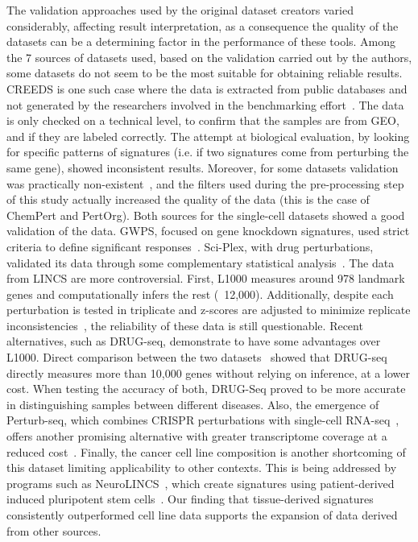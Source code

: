The validation approaches used by the original dataset creators varied considerably, affecting result interpretation, as a consequence the quality of the datasets can be a determining factor in the performance of these tools. 
Among the 7 sources of datasets used, based on the validation carried out by the authors, some datasets do not seem to be the most suitable for obtaining reliable results. 
\gls{CREEDS} is one such case where the data is extracted from public databases and not generated by the researchers involved in the benchmarking effort~\cite{RN87}. 
The data is only checked on a technical level, to confirm that the samples are from \gls{GEO}, and if they are labeled correctly. 
The attempt at biological evaluation, by looking for specific patterns of signatures (i.e. if two signatures come from perturbing the same gene), showed inconsistent results. 
Moreover, for some datasets validation was practically non-existent~\cite{RN85, RN86}, and the filters used during the pre-processing step of this study actually increased the quality of the data (this is the case of ChemPert and PertOrg). 
Both sources for the single-cell datasets showed a good validation of the data. GWPS, focused on gene knockdown signatures, used strict criteria to define significant responses~\cite{RN89}. 
Sci-Plex, with drug perturbations, validated its data through some complementary statistical analysis~\cite{RN88}. 
The data from \gls{LINCS} are more controversial. 
First, L1000 measures around 978 landmark genes and computationally infers the rest (~12,000). 
Additionally, despite each perturbation is tested in triplicate and z-scores are adjusted to minimize replicate inconsistencies~\cite{RN30}, the reliability of these data is still questionable. 
Recent alternatives, such as DRUG-seq, demonstrate to have some advantages over L1000. 
Direct comparison between the two datasets~\cite{RN130, RN105} showed that DRUG-seq directly measures more than 10,000 genes without relying on inference, at a lower cost. 
When testing the accuracy of both, DRUG-Seq proved to be more accurate in distinguishing samples between different diseases. 
Also, the emergence of Perturb-seq, which combines \gls{CRISPR} perturbations with single-cell RNA-seq~\cite{RN89}, offers another promising alternative with greater transcriptome coverage at a reduced cost~\cite{RN165}. 
Finally, the cancer cell line composition is another shortcoming of this dataset limiting applicability to other contexts. 
This is being addressed by programs such as Neuro\gls{LINCS}~\cite{RN164}, which create signatures using patient-derived induced pluripotent stem cells~\cite{RN165}. 
Our finding that tissue-derived signatures consistently outperformed cell line data supports the expansion of data derived from other sources.

